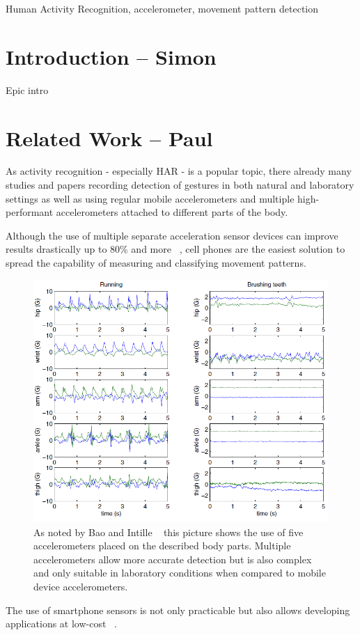 \documentclass[conference]{IEEEtran}
\begin{document}
\begin{IEEEkeywords}
Human Activity Recognition, accelerometer, movement pattern detection
\end{IEEEkeywords}

\section{Introduction -- Simon}
Epic intro

\section{Related Work -- Paul}
As activity recognition - especially \ac{HAR} - is a popular topic, there already many studies and papers recording detection of gestures in both natural and laboratory settings as well as using regular mobile accelerometers and multiple high-performant accelerometers attached to different parts of the body.

Although the use of multiple separate acceleration sensor devices can improve results drastically up to 80\% and more ~\cite{Bao2004}, cell phones are the easiest solution to spread the capability of measuring and classifying movement patterns.
\begin{figure}[!htb]
\centering
\includegraphics[width=\linewidth]{multiple_accelerometers}
\caption{As noted by Bao and Intille ~\cite{Bao2004} this picture shows the use of five accelerometers placed on the described body parts. Multiple accelerometers allow more accurate detection but is also complex and only suitable in laboratory conditions when compared to mobile device accelerometers.}
\label{fig:multipleAccelerometers}
\end{figure}
The use of smartphone sensors is not only practicable but also allows developing applications at low-cost ~\cite{Brezmes2009}.
\end{document}
